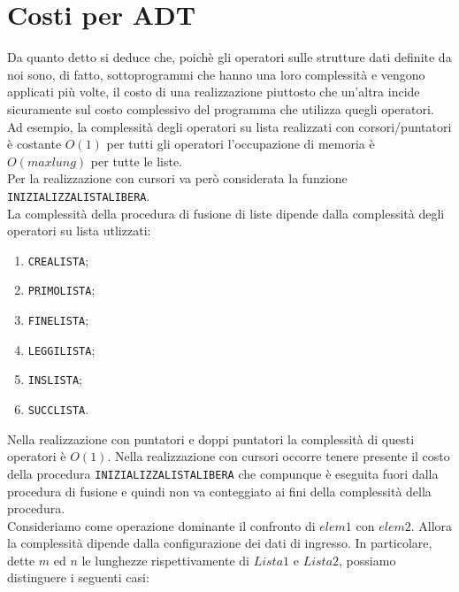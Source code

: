 \documentclass[12pt]{report}
\begin{document}
   	\section{Costi per ADT}
   	Da quanto detto si deduce che, poichè gli operatori sulle strutture dati definite da noi sono, di fatto, sottoprogrammi che hanno una loro complessità e vengono applicati più volte, il costo di una realizzazione piuttosto che un'altra incide sicuramente sul costo complessivo del programma che utilizza quegli operatori. \\
   	Ad esempio, la complessità degli operatori su lista realizzati con corsori/puntatori è costante $O(1)$ per tutti gli operatori l'occupazione di memoria è $O(maxlung)$ per tutte le liste. \\
   	Per la realizzazione con cursori va però considerata la funzione \texttt{INIZIALIZZALISTALIBERA}. \\
   	La complessità della procedura di fusione di liste dipende dalla complessità degli operatori su lista utlizzati:
   	\begin{enumerate}
   		\item \texttt{CREALISTA};
   		\item \texttt{PRIMOLISTA};
   		\item \texttt{FINELISTA};
   		\item \texttt{LEGGILISTA};
   		\item \texttt{INSLISTA};
   		\item \texttt{SUCCLISTA}.
   	\end{enumerate}
   	Nella realizzazione con puntatori e doppi puntatori la complessità di questi operatori è $O(1)$. Nella realizzazione con cursori occorre tenere presente il costo della procedura \texttt{INIZIALIZZALISTALIBERA} che compunque è eseguita fuori dalla procedura di fusione e quindi non va conteggiato ai fini della complessità della procedura. \\
   	Consideriamo come operazione dominante il confronto di $elem1$ con $elem2$. Allora la complessità dipende dalla configurazione dei dati di ingresso. In particolare, dette $m$ ed $n$ le lunghezze rispettivamente di $Lista1$ e $Lista2$, possiamo distinguere i seguenti casi:
\end{document}
